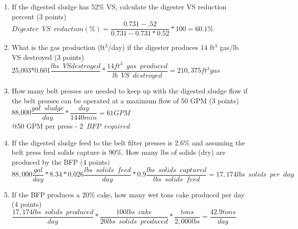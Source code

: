 \documentclass{article}
\begin{document}
\begin{enumerate}
\begin{enumerate}
\item If the digested sludge has 52\% VS, calculate the digester VS reduction percent (3 points)\\

$
Digester \enspace VS \enspace reduction (\%)=
	\dfrac
	{0.731 - .52}
	{0.731 - 0.731 *0.52}
	*100=\boxed{60.1\%}
$\\
\vspace{2cm}

\item What is the gas production (ft$^3$/day) if the digester produces 14 ft$^3$ gas/lb VS destroyed (3 points)\\
25,003*0.601$\dfrac{lbs\enspace VS destroyed}{}*\dfrac{14ft^3 \enspace gas \enspace produced}{lb \enspace VS \enspace destroyed}=\boxed{210,375ft^3 gas}$
\\
\vspace{2cm}

\item How many belt presses are needed to keep up with the digested sludge flow if the belt presses can be operated at a maximum flow of 50 GPM (3 points)\\

88,000$\dfrac{gal \enspace sludge}{day}*\dfrac{day}{1440min}=61 GPM$\\
@50 GPM per press - $\boxed{2 \enspace BFP \enspace required}$
\vspace{2cm}
\item If the digested sludge feed to the belt filter presses is 2.6\% and assuming the belt press feed solids capture is 90\%.  How many lbs of solids (dry) are produced by the BFP (4 points)\\
$88,000\dfrac{gal}{day}*8.34*0.026\dfrac{lbs \enspace solids \enspace feed}{day}*0.9\dfrac{lbs \enspace solids \enspace captured}{lbs \enspace solids \enspace feed}=\boxed{17,174 lbs \enspace solids \enspace per \enspace day}$
\vspace{2cm}

\item If the BFP produces a 20\% cake, how many wet tons cake produced per day (4 points)\\
$\dfrac{17,174 lbs \enspace solids \enspace produced}{day}*\dfrac{100 lbs \enspace cake}{20 lbs \enspace solids \enspace produced}*\dfrac{tons}{2,000 lbs}=\boxed{\dfrac{42.9tons}{day}}$
\vspace{2cm}


\end{enumerate}
\end{enumerate}
\end{document}
